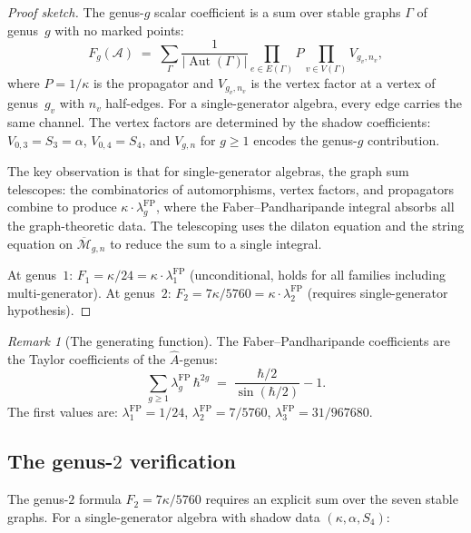 \documentclass[11pt,reqno]{amsart}
\theoremstyle{definition}
\theoremstyle{remark}
\newtheorem{remark}[theorem]{Remark}
\newcommand{\cA}{\mathcal{A}}
\newcommand{\Mbar}{\overline{\mathcal{M}}}
\DeclareMathOperator{\Aut}{Aut}
\numberwithin{equation}{section}
\begin{document}
\begin{proof}[Proof sketch]
The genus-$g$ scalar coefficient is a sum over stable graphs
$\Gamma$ of genus~$g$ with no marked points:
\[
 F_g(\cA) \;=\;
 \sum_\Gamma
 \frac{1}{|\Aut(\Gamma)|}
 \prod_{e \in E(\Gamma)} P
 \prod_{v \in V(\Gamma)} V_{g_v, n_v},
\]
where $P = 1/\kappa$ is the propagator and
$V_{g_v, n_v}$ is the vertex factor at a vertex of
genus~$g_v$ with $n_v$ half-edges. For a single-generator
algebra, every edge carries the same channel. The vertex
factors are determined by the shadow coefficients:
$V_{0,3} = S_3 = \alpha$, $V_{0,4} = S_4$, and
$V_{g,n}$ for $g \ge 1$ encodes the genus-$g$ contribution.

The key observation is that for single-generator algebras,
the graph sum telescopes: the combinatorics of
automorphisms, vertex factors, and propagators combine to
produce $\kappa \cdot \lambda_g^{\mathrm{FP}}$, where the
Faber--Pandharipande integral absorbs all the graph-theoretic
data. The telescoping uses the dilaton equation and the
string equation on $\Mbar_{g,n}$ to reduce the sum to a
single integral.

At genus~$1$: $F_1 = \kappa/24 = \kappa \cdot
\lambda_1^{\mathrm{FP}}$ (unconditional, holds for all
families including multi-generator).
At genus~$2$: $F_2 = 7\kappa/5760 = \kappa \cdot
\lambda_2^{\mathrm{FP}}$ (requires single-generator
hypothesis).
\end{proof}

\begin{remark}[The generating
function]\label{rem:FP-generating}
The Faber--Pandharipande coefficients are the Taylor
coefficients of the $\hat{A}$-genus:
\[
 \sum_{g \ge 1} \lambda_g^{\mathrm{FP}}\, \hbar^{2g}
 \;=\;
 \frac{\hbar/2}{\sin(\hbar/2)} - 1.
\]
The first values are: $\lambda_1^{\mathrm{FP}} = 1/24$,
$\lambda_2^{\mathrm{FP}} = 7/5760$,
$\lambda_3^{\mathrm{FP}} = 31/967680$.
\end{remark}

\subsection{The genus-$2$ verification}
\label{subsec:genus2-verification}

The genus-$2$ formula
$F_2 = 7\kappa/5760$ requires an explicit sum over the
seven stable graphs. For a single-generator algebra with
shadow data $(\kappa, \alpha, S_4)$:
\end{document}
